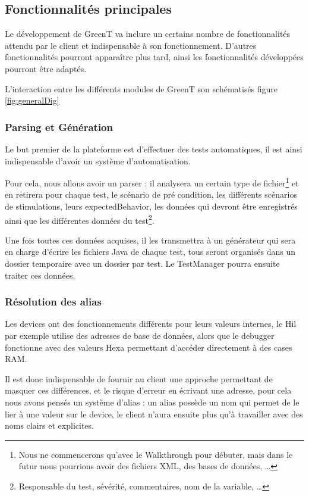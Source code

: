 	\subsection{Fonctionnalités principales}
	Le développement de GreenT va inclure un certains nombre de fonctionnalités attendu par le client et indispensable à son fonctionnement. D'autres fonctionnalités pourront apparaître plus tard, ainsi les fonctionnalités développées pourront être adaptés.

	L'interaction entre les différents modules de GreenT son schématisés figure \ref{fig:generalDig}

	\subsubsection{Parsing et Génération}\label{generation}
	Le but premier de la plateforme est d'effectuer des tests automatiques, il est ainsi indispensable d'avoir un système d'automatisation.

	Pour cela, nous allons avoir un parser : il analysera un certain type de fichier\footnote{Nous ne commencerons qu'avec le Walkthrough pour débuter, mais dans le futur nous pourrions avoir des fichiers XML, des bases de données, \ldots} et en retirera pour chaque test, le scénario de pré condition, les différents scénarios de stimulations, leurs expectedBehavior, les données qui devront être enregistrés ainsi que les différentes données du test\footnote{Responsable du test, sévérité, commentaires, nom de la variable, \ldots}.

	Une fois toutes ces données acquises, il les transmettra à un générateur qui sera en charge d'écrire les fichiers Java de chaque test, tous seront organisés dans un dossier temporaire avec un dossier par test. Le TestManager pourra ensuite traiter ces données.

	\subsubsection{Résolution des alias}\label{alias}
		Les devices ont des fonctionnements différents pour leurs valeurs internes, le Hil par exemple utilise des adresses de base de données, alors que le debugger fonctionne avec des valeurs Hexa permettant d'accéder directement à des cases RAM.

		Il est donc indispensable de fournir au client une approche permettant de masquer ces différences, et le risque d'erreur en écrivant une adresse, pour cela nous avons pensés un système d'alias : un alias possède un nom qui permet de le lier à une valeur sur le device, le client n'aura ensuite plus qu'à travailler avec des noms clairs et explicites.

